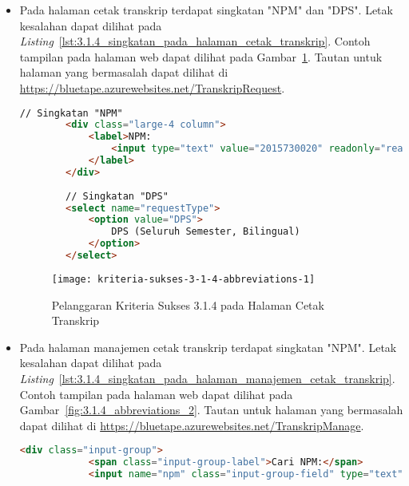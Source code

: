 \begin{itemize}
    \item Pada halaman cetak transkrip terdapat singkatan "NPM" dan "DPS". Letak kesalahan dapat dilihat pada \mbox{\textit{Listing} \ref{lst:3.1.4_singkatan_pada_halaman_cetak_transkrip}}. Contoh tampilan pada halaman web dapat dilihat pada \mbox{Gambar \ref{fig:3.1.4_abbreviations_1}}. Tautan untuk halaman yang bermasalah dapat dilihat di \url{https://bluetape.azurewebsites.net/TranskripRequest}.
    \begin{lstlisting}[frame=single, label={lst:3.1.4_singkatan_pada_halaman_cetak_transkrip}, language=HTML, caption=Pelanggaran Kriteria Sukses 3.1.4 pada Halaman Cetak Transkrip]
        // Singkatan "NPM"
        <div class="large-4 column">
            <label>NPM:
                <input type="text" value="2015730020" readonly="readonly"/>
            </label>
        </div>
        
        // Singkatan "DPS"
        <select name="requestType">
            <option value="DPS">
                DPS (Seluruh Semester, Bilingual)
            </option>
        </select>
    \end{lstlisting}

    \begin{figure}[H]
        \centering  
        \texttt{[image: kriteria-sukses-3-1-4-abbreviations-1]}  
        \caption[Pelanggaran Kriteria Sukses 3.1.4 pada Halaman Cetak Transkrip]{Pelanggaran Kriteria Sukses 3.1.4 pada Halaman Cetak Transkrip}
        \label{fig:3.1.4_abbreviations_1}  
    \end{figure}

    \item Pada halaman manajemen cetak transkrip terdapat singkatan "NPM". Letak kesalahan dapat dilihat pada \mbox{\textit{Listing} \ref{lst:3.1.4_singkatan_pada_halaman_manajemen_cetak_transkrip}}. Contoh tampilan pada halaman web dapat dilihat pada \mbox{Gambar \ref{fig:3.1.4_abbreviations_2}}. Tautan untuk halaman yang bermasalah dapat dilihat di \url{https://bluetape.azurewebsites.net/TranskripManage}.
    \begin{lstlisting}[frame=single, label={lst:3.1.4_singkatan_pada_halaman_manajemen_cetak_transkrip}, language=HTML, caption=Pelanggaran Kriteria Sukses 3.1.4 pada Halaman Manajemen Cetak Transkrip]
        <div class="input-group">
            <span class="input-group-label">Cari NPM:</span>
            <input name="npm" class="input-group-field" type="text" placeholder="2013730013" maxlength="10" minlength="10"/>
    \end{lstlisting}


\end{itemize}
